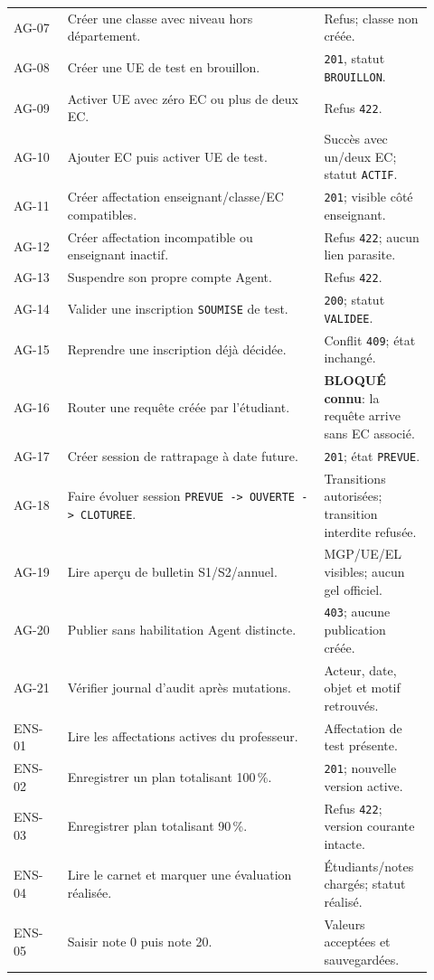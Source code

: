\documentclass[10pt,a4paper]{article}
\begin{document}
\begin{longtable}{p{0.12\linewidth}p{0.58\linewidth}p{0.22\linewidth}}
AG-07 & Créer une classe avec niveau hors département. & Refus; classe non créée. \\
AG-08 & Créer une UE de test en brouillon. & \texttt{201}, statut \texttt{BROUILLON}. \\
AG-09 & Activer UE avec zéro EC ou plus de deux EC. & Refus \texttt{422}. \\
AG-10 & Ajouter EC puis activer UE de test. & Succès avec un/deux EC; statut \texttt{ACTIF}. \\
AG-11 & Créer affectation enseignant/classe/EC compatibles. & \texttt{201}; visible côté enseignant. \\
AG-12 & Créer affectation incompatible ou enseignant inactif. & Refus \texttt{422}; aucun lien parasite. \\
AG-13 & Suspendre son propre compte Agent. & Refus \texttt{422}. \\
AG-14 & Valider une inscription \texttt{SOUMISE} de test. & \texttt{200}; statut \texttt{VALIDEE}. \\
AG-15 & Reprendre une inscription déjà décidée. & Conflit \texttt{409}; état inchangé. \\
AG-16 & Router une requête créée par l’étudiant. & \textbf{BLOQUÉ connu}: la requête arrive sans EC associé. \\
AG-17 & Créer session de rattrapage à date future. & \texttt{201}; état \texttt{PREVUE}. \\
AG-18 & Faire évoluer session \texttt{PREVUE -> OUVERTE -> CLOTUREE}. & Transitions autorisées; transition interdite refusée. \\
AG-19 & Lire aperçu de bulletin S1/S2/annuel. & MGP/UE/EL visibles; aucun gel officiel. \\
AG-20 & Publier sans habilitation Agent distincte. & \texttt{403}; aucune publication créée. \\
AG-21 & Vérifier journal d’audit après mutations. & Acteur, date, objet et motif retrouvés. \\
ENS-01 & Lire les affectations actives du professeur. & Affectation de test présente. \\
ENS-02 & Enregistrer un plan totalisant 100\,\%. & \texttt{201}; nouvelle version active. \\
ENS-03 & Enregistrer plan totalisant 90\,\%. & Refus \texttt{422}; version courante intacte. \\
ENS-04 & Lire le carnet et marquer une évaluation réalisée. & Étudiants/notes chargés; statut réalisé. \\
ENS-05 & Saisir note 0 puis note 20. & Valeurs acceptées et sauvegardées. \\

\end{longtable}
\end{document}
